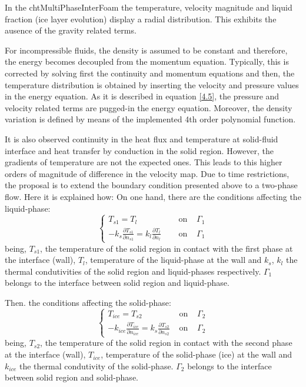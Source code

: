 \noindent In the chtMultiPhaseInterFoam the temperature, velocity magnitude and liquid fraction (ice layer evolution) display a radial distribution. This exhibits the ausence of the gravity related terms. 

\noindent For incompressible fluids, the density is assumed to be constant and therefore, the energy becomes decoupled from the momentum equation. Typically, this is corrected by solving first the continuity and momentum equations and then, the temperature distribution is obtained by inserting the velocity and pressure values in the energy equation. As it is described in equation \ref{4.5}, the pressure and velocity related terms are pugged-in the energy equation. Moreover, the density variation is defined by means of the implemented 4th order polynomial function. 

\noindent It is also observed continuity in the heat flux and temperature at solid-fluid interface and heat transfer by conduction in the solid region. However, the gradients of temperature are not the expected ones. This leads to this higher orders of magnitude of difference in the velocity map. 
Due to time restrictions, the proposal is to extend the boundary condition presented above to a two-phase flow. Here it is explained how:
On one hand, there are the conditions affecting the liquid-phase:
\begin{equation}
\left\{\begin{array}{lll}
T_{s 1}=T_{l} & \text { on } & \Gamma_{1} \\
-k_{s} \frac{\partial T_{s 1}}{\partial n_{s 1}}=k_{l} \frac{\partial T_{l}}{\partial n_{l}} \quad & \text { on } & \Gamma_{1}
\end{array}\right.
\label{4.14}
\end{equation}
being, $T_{s 1}$, the temperature of the solid region in contact with the first phase at the interface (wall), $T_{l}$, temperature of the liquid-phase at the wall and $k_{s}$, $k_{l}$ the thermal condutivities of the solid region and liquid-phases respectively. $\Gamma_{1}$ belongs to the interface between solid region and liquid-phase.

\noindent Then. the conditions affecting the solid-phase:
\begin{equation}
\left\{\begin{array}{lll}
T_{ice}=T_{s 2} & \text { on } & \Gamma_{2} \\
-k_{ice} \frac{\partial T_{ice}}{\partial n_{ice}}=k_{s} \frac{\partial T_{s 2}}{\partial n_{s 2}} & \text { on } & \Gamma_{2}
\end{array}\right.
\label{4.15}
\end{equation}
being, $T_{s 2}$, the temperature of the solid region in contact with the second phase at the interface (wall), $T_{ice}$, temperature of the solid-phase (ice) at the wall and $k_{ice}$ the thermal condutivity of the solid-phase. $\Gamma_{2}$ belongs to the interface between solid region and solid-phase.

